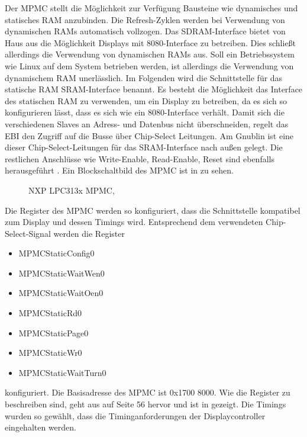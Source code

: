Der MPMC stellt die Möglichkeit zur Verfügung Bausteine wie dynamisches und statisches RAM anzubinden. Die Refresh-Zyklen werden bei Verwendung von dynamischen RAMs automatisch vollzogen. Das SDRAM-Interface bietet von Haus aus die Möglichkeit Displays mit 8080-Interface zu betreiben. Dies schließt allerdings die Verwendung von dynamischen RAMs aus. Soll ein Betriebssystem wie Linux auf dem System betrieben werden, ist allerdings die Verwendung von dynamischem RAM unerlässlich. Im Folgenden wird die Schnittstelle für das statische RAM SRAM-Interface benannt. Es besteht die Möglichkeit das Interface des statischen RAM zu verwenden, um ein Display zu betreiben, da es sich so konfigurieren lässt, dass es sich wie ein 8080-Interface verhält. Damit sich die verschiedenen Slaves an Adress- und Datenbus nicht überschneiden, regelt das EBI den Zugriff auf die Busse über Chip-Select Leitungen. Am Gnublin ist eine dieser Chip-Select-Leitungen für das SRAM-Interface nach außen gelegt. Die restlichen Anschlüsse wie Write-Enable, Read-Enable, Reset sind ebenfalls herausgeführt \cite{NXP2010}. Ein Blockschaltbild des MPMC ist in  zu sehen.


\begin{figure}[tbph]
	\centering
{}
	\caption{NXP LPC313x MPMC, \cite{NXP2010} }
	\label{fig:lpc_mpmc}
\end{figure}
\newpage
Die Register des MPMC werden so konfiguriert, dass die Schnittstelle kompatibel zum Display und dessen Timings wird. Entsprechend dem verwendeten Chip-Select-Signal werden die Register \begin{itemize}
\item MPMCStaticConfig0
\item  MPMCStaticWaitWen0
\item  MPMCStaticWaitOen0
\item  MPMCStaticRd0
\item  MPMCStaticPage0
\item  MPMCStaticWr0
\item MPMCStaticWaitTurn0 
\end{itemize} konfiguriert. Die Basisadresse des MPMC ist 0x1700 8000. Wie die Register zu beschreiben sind, geht aus \cite{NXP2010} auf Seite 56 hervor und ist in  gezeigt. Die Timings wurden so gewählt, dass die Timinganforderungen der Displaycontroller eingehalten werden.

